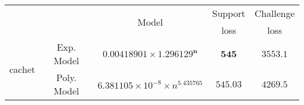 \begin{tabular}{ccccc} 
\hline 
 &  & \multirow{2}{*}{Model} & Support & Challenge\tabularnewline 
 &  &  & loss  & loss\tabularnewline 
\hline 
\hline 
\multirow{2}{*}{cachet} & Exp. Model & $\mathbf{0.00418901\times 1.296129^{n}}$ & $\mathbf{545}$ & $\mathbf{3553.1}$ \tabularnewline 
 & Poly. Model & $6.381105\times10^{-8}\times n^{5.435765}$ & $545.03$ & $4269.5$ \tabularnewline 
\hline 
\end{tabular} 

